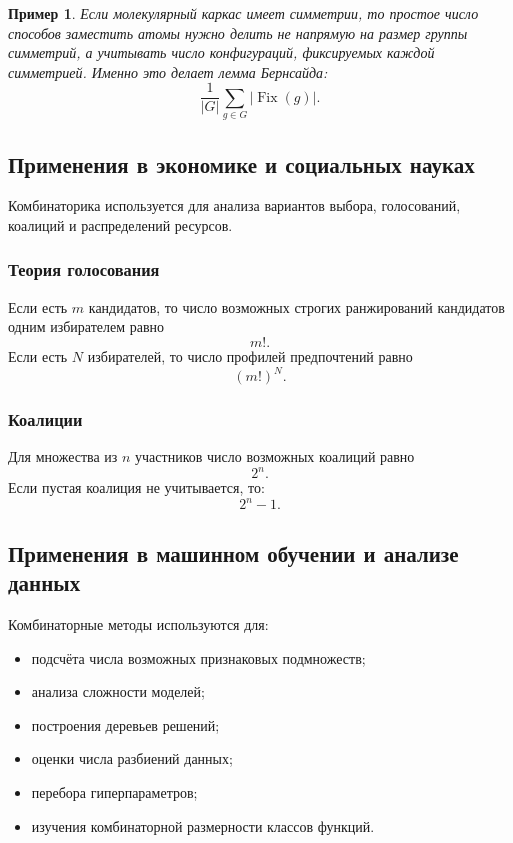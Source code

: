 \documentclass[12pt,a4paper]{article}
\newtheorem{example}{Пример}
\begin{document}
\begin{example}
Если молекулярный каркас имеет симметрии, то простое число способов заместить атомы нужно делить не напрямую на размер группы симметрий, а учитывать число конфигураций, фиксируемых каждой симметрией. Именно это делает лемма Бернсайда:
\[
\frac{1}{|G|}\sum_{g\in G}|\operatorname{Fix}(g)|.
\]
\end{example}

\subsection{Применения в экономике и социальных науках}

Комбинаторика используется для анализа вариантов выбора, голосований, коалиций и распределений ресурсов.

\subsubsection{Теория голосования}

Если есть $m$ кандидатов, то число возможных строгих ранжирований кандидатов одним избирателем равно
\[
m!.
\]
Если есть $N$ избирателей, то число профилей предпочтений равно
\[
(m!)^N.
\]

\subsubsection{Коалиции}

Для множества из $n$ участников число возможных коалиций равно
\[
2^n.
\]
Если пустая коалиция не учитывается, то:
\[
2^n-1.
\]

\subsection{Применения в машинном обучении и анализе данных}

Комбинаторные методы используются для:
\begin{itemize}
    \item подсчёта числа возможных признаковых подмножеств;
    \item анализа сложности моделей;
    \item построения деревьев решений;
    \item оценки числа разбиений данных;
    \item перебора гиперпараметров;
    \item изучения комбинаторной размерности классов функций.
\end{itemize}
\end{document}
